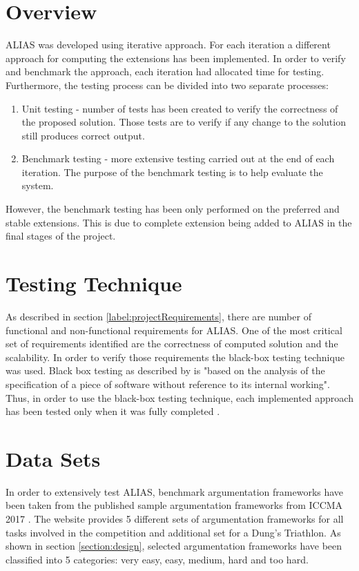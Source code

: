 \section{Overview}
ALIAS was developed using iterative approach. For each iteration a different approach for computing the extensions has been implemented. In order to verify and benchmark the approach, each iteration had allocated time for testing. Furthermore, the testing process can be divided into two separate processes: 
\begin{enumerate}
	\item Unit testing - number of tests has been created to verify the correctness of the proposed solution. Those tests are to verify if any change to the solution still produces correct output. 
	\item Benchmark testing - more extensive testing carried out at the end of each iteration. The purpose of the benchmark testing is to help evaluate the system. 
\end{enumerate}
However, the benchmark testing has been only performed on the preferred and stable extensions. This is due to complete extension being added to ALIAS in the final stages of the project.

\section{Testing Technique}
As described in section \ref{label:projectRequirements}, there are number of functional and non-functional requirements for ALIAS. One of the most critical set of requirements identified are the correctness of computed solution and the scalability. In order to verify those requirements the black-box testing technique was used. Black box testing as described by \citet{testing2} is "based on the analysis of the specification of a piece of software without reference to its internal working". Thus, in order to use the black-box testing technique, each implemented approach has been tested only when it was fully completed \citep{blackbox}.

\section{Data Sets}
In order to extensively test ALIAS, benchmark argumentation frameworks have been taken from the published sample argumentation frameworks from ICCMA 2017 \citep{iccmaResults}. The website provides 5 different sets of argumentation frameworks for all tasks involved in the competition and additional set for a Dung's Triathlon. As shown in section \ref{section:design}, selected argumentation frameworks have been classified into 5 categories: very easy, easy, medium, hard and too hard. 

